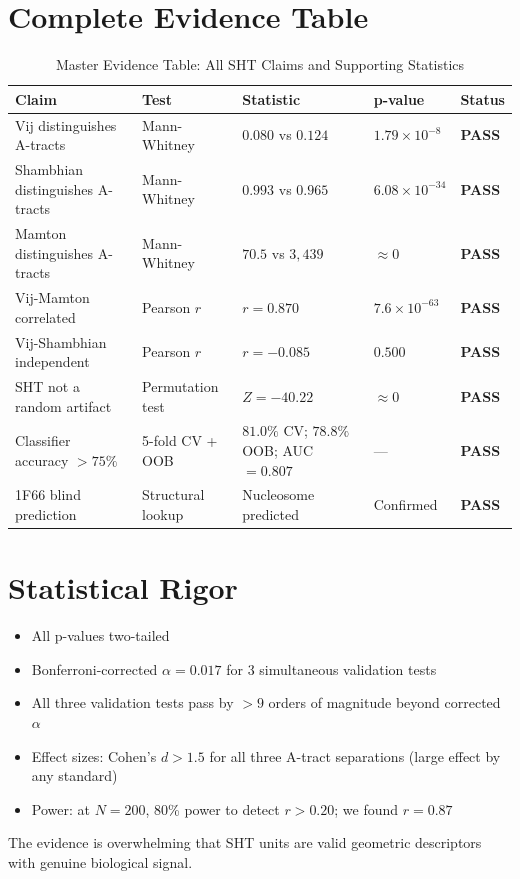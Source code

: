 \section{Complete Evidence Table}

\begin{table}[H]
    \centering
    \caption{Master Evidence Table: All SHT Claims and Supporting Statistics}
    \begin{tabularx}{\textwidth}{lXlll}
        \toprule
        \textbf{Claim} & \textbf{Test} & \textbf{Statistic} & \textbf{p-value} & \textbf{Status} \\
        \midrule
        Vij distinguishes A-tracts & Mann-Whitney & $0.080$ vs $0.124$ & $1.79 \times 10^{-8}$ & \textbf{PASS} \\
        \addlinespace
        Shambhian distinguishes A-tracts & Mann-Whitney & $0.993$ vs $0.965$ & $6.08 \times 10^{-34}$ & \textbf{PASS} \\
        \addlinespace
        Mamton distinguishes A-tracts & Mann-Whitney & $70.5$ vs $3{,}439$ & $\approx 0$ & \textbf{PASS} \\
        \addlinespace
        Vij-Mamton correlated & Pearson $r$ & $r = 0.870$ & $7.6 \times 10^{-63}$ & \textbf{PASS} \\
        \addlinespace
        Vij-Shambhian independent & Pearson $r$ & $r = -0.085$ & $0.500$ & \textbf{PASS} \\
        \addlinespace
        SHT not a random artifact & Permutation test & $Z = -40.22$ & $\approx 0$ & \textbf{PASS} \\
        \addlinespace
        Classifier accuracy $> 75\%$ & 5-fold CV + OOB & $81.0\%$ CV; $78.8\%$ OOB; AUC $= 0.807$ & --- & \textbf{PASS} \\
        \addlinespace
        1F66 blind prediction & Structural lookup & Nucleosome predicted & Confirmed & \textbf{PASS} \\
        \bottomrule
    \end{tabularx}
\end{table}

\section{Statistical Rigor}

\begin{itemize}
    \item All p-values two-tailed
    \item Bonferroni-corrected $\alpha = 0.017$ for 3 simultaneous validation tests
    \item All three validation tests pass by $> 9$ orders of magnitude beyond corrected $\alpha$
    \item Effect sizes: Cohen's $d > 1.5$ for all three A-tract separations (large effect by any standard)
    \item Power: at $N = 200$, 80\% power to detect $r > 0.20$; we found $r = 0.87$
\end{itemize}

The evidence is overwhelming that SHT units are valid geometric descriptors with genuine biological signal.

